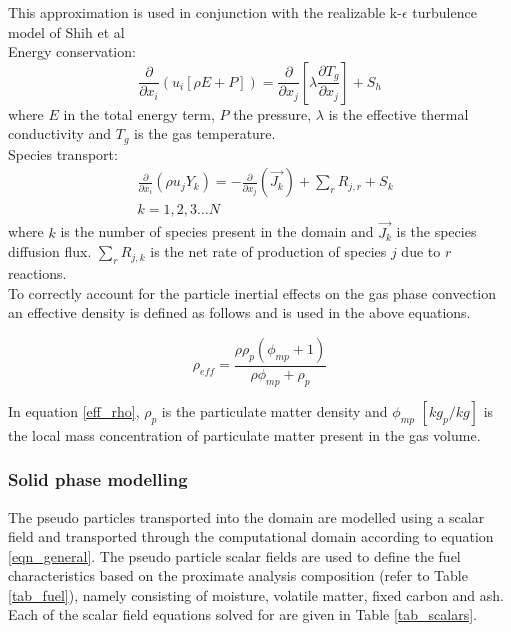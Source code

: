\documentclass{webofc}
\begin{document}
This approximation is used in conjunction with the realizable k-$\epsilon$ turbulence model of Shih et al \cite{shih}\\

Energy conservation:
\begin{equation}\label{eqn_energy}
\frac{\partial }{\partial x_{i}} (u_{i}[\rho E+P])=\frac{\partial }{\partial x_{j}}\left[\lambda\frac{\partial T_{g}}{\partial x_{j}}\right] +S_{h}
\end{equation}
where $E$ in the total energy term, $P$ the pressure, $\lambda$ is the effective thermal conductivity and $T_g$ is the gas temperature.\\

Species transport:
\begin{equation}\label{eqn_species}
\begin{split}
&\frac{\partial}{\partial x_{i}}(\rho u_{j}Y_{k})=-\frac{\partial}{\partial x_{j}}(\vec{J_{k}})+ \sum_r R_{j,r} + S_{k}\\
&k = 1,2,3...N
\end{split}
\end{equation}
where $k$ is the number of species present in the domain and $\vec{J_{k}}$ is the species diffusion flux. $\sum_r R_{j,k}$ is the net rate of production of species $j$ due to $r$ reactions.\\

To correctly account for the particle inertial effects on the gas phase convection an effective density is defined as follows and is used in the above equations.

\begin{equation} \label{eff_rho}
	\rho_{eff} = \frac{\rho \rho_p \left( \phi_{mp} + 1 \right)}{\rho \phi_{mp} + \rho_p}
\end{equation}

In equation \eqref{eff_rho}, $\rho_p$ is the particulate matter density and $\phi_{mp}$ $[kg_p/kg]$ is the local mass concentration of particulate matter present in the gas volume. 
\\
\subsubsection{Solid phase modelling}
The pseudo particles transported into the domain are modelled using a scalar field and transported through the computational domain according to equation \eqref{eqn_general}. The pseudo particle scalar fields are used to define the fuel characteristics based on the proximate analysis composition (refer to Table \ref{tab_fuel}), namely consisting of moisture, volatile matter, fixed  carbon and ash. Each of the scalar field equations solved for are given in Table \ref{tab_scalars}.\\
\end{document}
